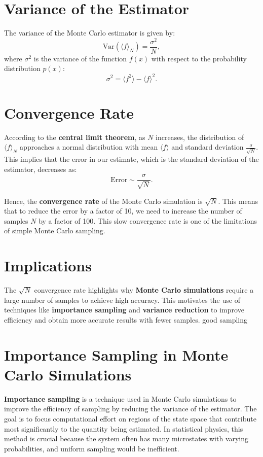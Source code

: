 \documentclass[ansiapaper]{report}
\begin{document}
\begin{multicols}{3}
\section*{Variance of the Estimator}

The variance of the Monte Carlo estimator is given by:
\[
\text{Var}(\langle f \rangle_N) = \frac{\sigma^2}{N},
\]
where \( \sigma^2 \) is the variance of the function \( f(x) \) with respect to the probability distribution \( p(x) \):
\[
\sigma^2 = \langle f^2 \rangle - \langle f \rangle^2.
\]

\section*{Convergence Rate}

According to the \textbf{central limit theorem}, as \( N \) increases, the distribution of \( \langle f \rangle_N \) approaches a normal distribution with mean \( \langle f \rangle \) and standard deviation \( \frac{\sigma}{\sqrt{N}} \). This implies that the error in our estimate, which is the standard deviation of the estimator, decreases as:
\[
\text{Error} \sim \frac{\sigma}{\sqrt{N}}.
\]

Hence, the \textbf{convergence rate} of the Monte Carlo simulation is \( \sqrt{N} \). This means that to reduce the error by a factor of 10, we need to increase the number of samples \( N \) by a factor of 100. This slow convergence rate is one of the limitations of simple Monte Carlo sampling.

\section*{Implications}

The \( \sqrt{N} \) convergence rate highlights why \textbf{Monte Carlo simulations} require a large number of samples to achieve high accuracy. This motivates the use of techniques like \textbf{importance sampling} and \textbf{variance reduction} to improve efficiency and obtain more accurate results with fewer samples.
good sampling


\section*{Importance Sampling in Monte Carlo Simulations}

\textbf{Importance sampling} is a technique used in Monte Carlo simulations to improve the efficiency of sampling by reducing the variance of the estimator. The goal is to focus computational effort on regions of the state space that contribute most significantly to the quantity being estimated. In statistical physics, this method is crucial because the system often has many microstates with varying probabilities, and uniform sampling would be inefficient.


\end{multicols}
\end{document}
